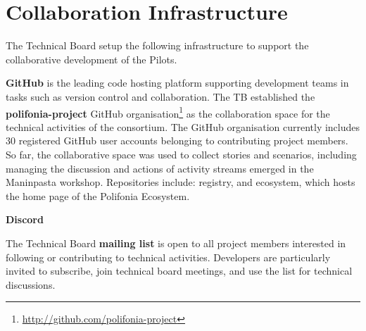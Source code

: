 \chapter{Collaboration Infrastructure}\label{ch:infrastructure}
The Technical Board setup the following infrastructure to support the collaborative development of the Pilots.

\textbf{GitHub} is the leading code hosting platform supporting development teams in tasks such as version control and collaboration. The TB established the \textbf{polifonia-project} GitHub organisation\footnote{\url{http://github.com/polifonia-project}} as the collaboration space for the technical activities of the consortium. The GitHub organisation currently includes 30 registered GitHub user accounts belonging to contributing project members.
So far, the collaborative space was used to collect stories and scenarios, including managing the discussion and actions of activity streams emerged in the Maninpasta workshop. Repositories include: registry, and ecosystem, which hosts the home page of the Polifonia Ecosystem.

\textbf{Discord}

The Technical Board \textbf{mailing list} is open to all project members interested in following or contributing to technical activities. Developers are particularly invited to subscribe, join technical board meetings, and use the list for technical discussions.






